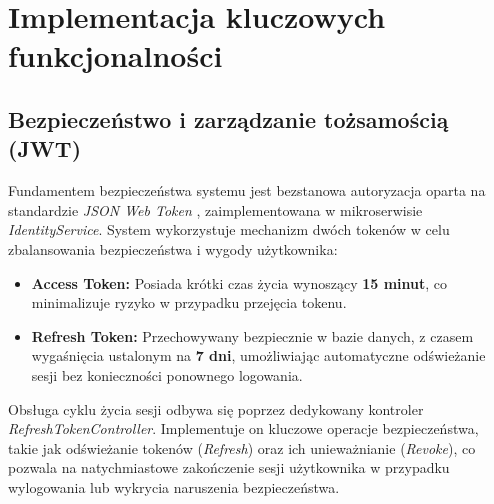 \newpage
\renewcommand{\sectioncolor}{chap3}
\section{Implementacja kluczowych funkcjonalności}

\subsection{Bezpieczeństwo i zarządzanie tożsamością (JWT)}
Fundamentem bezpieczeństwa systemu jest bezstanowa autoryzacja oparta na standardzie \textit{JSON Web Token} \cite{jwt_rfc}, zaimplementowana w mikroserwisie \textit{IdentityService}. System wykorzystuje mechanizm dwóch tokenów w celu zbalansowania bezpieczeństwa i wygody użytkownika:
\begin{itemize}
    \item \textbf{Access Token:} Posiada krótki czas życia wynoszący \textbf{15 minut}, co minimalizuje ryzyko w przypadku przejęcia tokenu.
    \item \textbf{Refresh Token:} Przechowywany bezpiecznie w bazie danych, z czasem wygaśnięcia ustalonym na \textbf{7 dni}, umożliwiając automatyczne odświeżanie sesji bez konieczności ponownego logowania.
\end{itemize}



Obsługa cyklu życia sesji odbywa się poprzez dedykowany kontroler \textit{RefreshTokenController}. Implementuje on kluczowe operacje bezpieczeństwa, takie jak odświeżanie tokenów (\textit{Refresh}) oraz ich unieważnianie (\textit{Revoke}), co pozwala na natychmiastowe zakończenie sesji użytkownika w przypadku wylogowania lub wykrycia naruszenia bezpieczeństwa.

